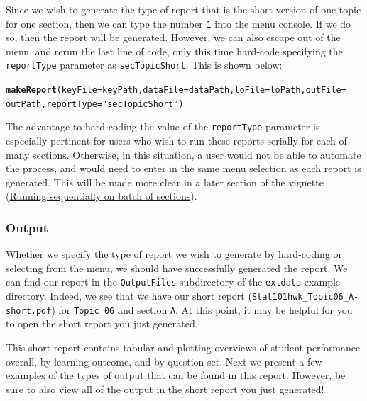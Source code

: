 \documentclass{article}\usepackage[]{graphicx}\usepackage[]{color}
\makeatletter
\newcommand{\hlstr}[1]{\textcolor[rgb]{0.192,0.494,0.8}{#1}}%
\newcommand{\hlstd}[1]{\textcolor[rgb]{0.345,0.345,0.345}{#1}}%
\newcommand{\hlkwc}[1]{\textcolor[rgb]{0.333,0.667,0.333}{#1}}%
\newcommand{\hlkwd}[1]{\textcolor[rgb]{0.737,0.353,0.396}{\textbf{#1}}}%
\newenvironment{kframe}{%
 \def\at@end@of@kframe{}%
 \ifinner\ifhmode%
  \def\at@end@of@kframe{\end{minipage}}%
  \begin{minipage}{\columnwidth}%
 \fi\fi%
 \def\FrameCommand##1{\hskip\@totalleftmargin \hskip-\fboxsep
 \colorbox{shadecolor}{##1}\hskip-\fboxsep
     \hskip-\linewidth \hskip-\@totalleftmargin \hskip\columnwidth}%
 \MakeFramed {\advance\hsize-\width
   \@totalleftmargin\z@ \linewidth\hsize
   \@setminipage}}%
 {\par\unskip\endMakeFramed%
 \at@end@of@kframe}
\newenvironment{knitrout}{}{} %
\numberwithin{equation}{section} %
\makeatother
\begin{document}
Since we wish to generate the type of report that is the short version of one topic for one section, then we can type the number \texttt{1} into the menu console. If we do so, then the report will be generated. However, we can also escape out of the menu, and rerun the last line of code, only this time hard-code specifying the \texttt{reportType} parameter as \texttt{secTopicShort}. This is shown below: \\

\begin{knitrout}
\color{fgcolor}\begin{kframe}
\begin{alltt}
\hlkwd{makeReport}\hlstd{(}\hlkwc{keyFile} \hlstd{= keyPath,} \hlkwc{dataFile} \hlstd{= dataPath,} \hlkwc{loFile} \hlstd{= loPath,} \hlkwc{outFile} \hlstd{=}
  \hlstd{outPath,} \hlkwc{reportType} \hlstd{=} \hlstr{"secTopicShort"}\hlstd{)}
\end{alltt}
\end{kframe}
\end{knitrout}

The advantage to hard-coding the value of the \texttt{reportType} parameter is especially pertinent for users who wish to run these reports serially for each of many sections. Otherwise, in this situation, a user would not be able to automate the process, and would need to enter in the same menu selection as each report is generated. This will be made more clear in a later section of the vignette (\hyperref[sec:sequential]{Running sequentially on batch of sections}).

\subsubsection{Output}

Whether we specify the type of report we wish to generate by hard-coding or selecting from the menu, we should have successfully generated the report. We can find our report in the \texttt{OutputFiles} subdirectory of the \texttt{extdata} example directory. Indeed, we see that we have our short report (\texttt{Stat101hwk\_Topic06\_A-short.pdf}) for \texttt{Topic 06} and section \texttt{A}. At this point, it may be helpful for you to open the short report you just generated.

This short report contains tabular and plotting overviews of student performance overall, by learning outcome, and by question set. Next we present a few examples of the types of output that can be found in this report. However, be sure to also view all of the output in the short report you just generated!
\end{document}
